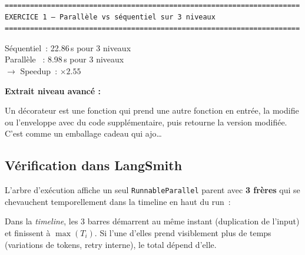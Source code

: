 \documentclass[11pt,a4paper]{article}
\begin{document}
\begin{tcolorbox}[
  colback=white,
  colframe=black!50,
  coltitle=black,
  fonttitle=\footnotesize\bfseries,
  fontupper=\footnotesize,
  title=Sortie de l'exécution,
  breakable,
]
\begin{verbatim}
======================================================================
EXERCICE 1 — Parallèle vs séquentiel sur 3 niveaux
======================================================================
\end{verbatim}

Séquentiel~: 22.86\,s pour 3 niveaux\\
Parallèle ~: 8.98\,s pour 3 niveaux\\
$\rightarrow$ Speedup~: $\times 2.55$

\textbf{Extrait niveau avancé :}

Un décorateur est une fonction qui prend une autre fonction en entrée, la
modifie ou l'enveloppe avec du code supplémentaire, puis retourne la
version modifiée. C'est comme un emballage cadeau qui ajo\dots
\end{tcolorbox}

\subsection{Vérification dans LangSmith}

L'arbre d'exécution affiche un seul \texttt{RunnableParallel} parent avec
\textbf{3 frères} qui se chevauchent temporellement dans la timeline en
haut du run~:

\begin{center}
\end{center}

Dans la \emph{timeline}, les 3 barres démarrent au même instant
(duplication de l'input) et finissent à $\max(T_i)$. Si l'une d'elles
prend visiblement plus de temps (variations de tokens, retry interne),
le total dépend d'elle.
\end{document}
